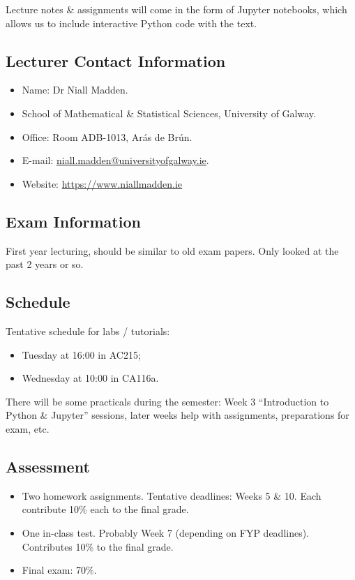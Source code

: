 \documentclass[a4paper,11pt]{article}
\begin{document}
Lecture notes \& assignments will come in the form of Jupyter notebooks, which allows us to include interactive Python code with the text.

\subsection{Lecturer Contact Information}
\begin{itemize}
    \item   Name: Dr Niall Madden.
    \item   School of Mathematical \& Statistical Sciences, University of Galway.
    \item   Office: Room ADB-1013, Arás de Brún.
    \item   E-mail: \href{mailto://niall.madden@universityofgalway.ie}{niall.madden@universityofgalway.ie}.
    \item   Website: \url{https://www.niallmadden.ie}
\end{itemize}

\subsection{Exam Information}
First year lecturing, should be similar to old exam papers.
Only looked at the past 2 years or so.

\subsection{Schedule}
Tentative schedule for labs / tutorials:
\begin{itemize}
    \item   Tuesday at 16:00 in AC215;
    \item   Wednesday at 10:00 in CA116a.
\end{itemize}

There will be some practicals during the semester: Week 3 ``Introduction to Python \& Jupyter'' sessions, later weeks help with assignments, preparations for exam, etc.

\subsection{Assessment}
\begin{itemize}
    \item   Two homework assignments.
            Tentative deadlines: Weeks 5 \& 10.
            Each contribute 10\% each to the final grade.

    \item   One in-class test.
            Probably Week 7 (depending on FYP deadlines).
            Contributes 10\% to the final grade.

    \item   Final exam: 70\%.
\end{itemize}
\end{document}

